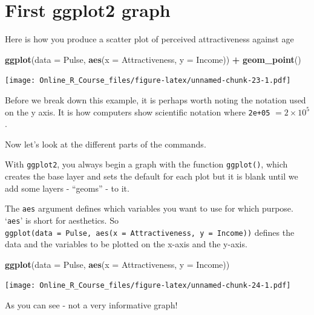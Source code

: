 \documentclass[]{book}
\newenvironment{Shaded}{\begin{snugshade}}{\end{snugshade}}
\newcommand{\DataTypeTok}[1]{\textcolor[rgb]{0.13,0.29,0.53}{#1}}
\newcommand{\KeywordTok}[1]{\textcolor[rgb]{0.13,0.29,0.53}{\textbf{#1}}}
\newcommand{\NormalTok}[1]{#1}
\newcommand{\OperatorTok}[1]{\textcolor[rgb]{0.81,0.36,0.00}{\textbf{#1}}}
\newcommand{\StringTok}[1]{\textcolor[rgb]{0.31,0.60,0.02}{#1}}
\begin{document}
\hypertarget{first-ggplot2-graph}{%
\section{First ggplot2 graph}\label{first-ggplot2-graph}}

Here is how you produce a scatter plot of perceived attractiveness against age

\begin{Shaded}
\begin{Highlighting}[]
\KeywordTok{ggplot}\NormalTok{(}\DataTypeTok{data =}\NormalTok{ Pulse, }\KeywordTok{aes}\NormalTok{(}\DataTypeTok{x =}\NormalTok{ Attractiveness, }\DataTypeTok{y =}\NormalTok{ Income)) }\OperatorTok{+}\StringTok{ }
\StringTok{  }\KeywordTok{geom_point}\NormalTok{()}
\end{Highlighting}
\end{Shaded}

\texttt{[image: Online\_R\_Course\_files/figure-latex/unnamed-chunk-23-1.pdf]}

Before we break down this example, it is perhaps worth noting the notation used on the y axis. It is how computers show scientific notation where \texttt{2e+05} \(= 2 \times 10^5\).

Now let's look at the different parts of the commands.

With \texttt{ggplot2}, you always begin a graph with the function \texttt{ggplot()}, which creates the base layer and sets the default for each plot but it is blank until we add some layers - ``geoms'' - to it.

The \texttt{aes} argument defines which variables you want to use for which purpose. `\texttt{aes}' is short for aesthetics. So \texttt{ggplot(data\ =\ Pulse,\ aes(x\ =\ Attractiveness,\ y\ =\ Income))} defines the data and the variables to be plotted on the x-axis and the y-axis.

\begin{Shaded}
\begin{Highlighting}[]
\KeywordTok{ggplot}\NormalTok{(}\DataTypeTok{data =}\NormalTok{ Pulse,  }\KeywordTok{aes}\NormalTok{(}\DataTypeTok{x =}\NormalTok{ Attractiveness, }\DataTypeTok{y =}\NormalTok{ Income))}
\end{Highlighting}
\end{Shaded}

\texttt{[image: Online\_R\_Course\_files/figure-latex/unnamed-chunk-24-1.pdf]}

As you can see - not a very informative graph!
\end{document}

